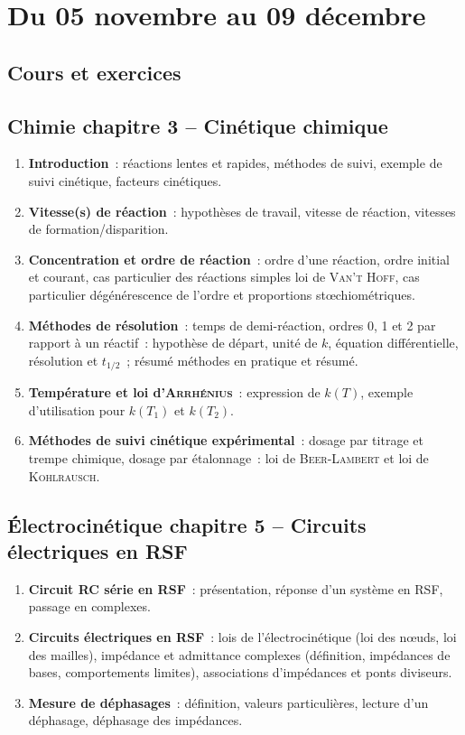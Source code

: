 \documentclass[a4paper, 12pt, final, garamond]{book}
\begin{document}
\setcounter{chapter}{9}

\chapter{Du 05 novembre au 09 d\'ecembre}

\section{Cours et exercices}
\section*{Chimie chapitre 3 -- Cinétique chimique}
\begin{enumerate}[label=\Roman*]
    \item \textbf{Introduction}~: réactions lentes et rapides, méthodes de
        suivi, exemple de suivi cinétique, facteurs cinétiques.
    \item \textbf{Vitesse(s) de réaction}~: hypothèses de travail, vitesse de
        réaction, vitesses de formation/disparition.
    \item \textbf{Concentration et ordre de réaction}~: ordre d'une réaction,
        ordre initial et courant, cas particulier des réactions simples loi de
        \textsc{Van't Hoff}, cas particulier dégénérescence de l'ordre et
        proportions stœchiométriques.
    \item \textbf{Méthodes de résolution}~: temps de demi-réaction, ordres 0, 1
        et 2 par rapport à un réactif~: hypothèse de départ, unité de $k$,
        équation différentielle, résolution et $t_{1/2}$~; résumé méthodes en
        pratique et résumé.
    \item \textbf{Température et loi d'\textsc{Arrhénius}}~: expression de
        $k(T)$, exemple d'utilisation pour $k(T_1)$ et $k(T_2)$.
    \item \textbf{Méthodes de suivi cinétique expérimental}~: dosage par
        titrage et trempe chimique, dosage par étalonnage~: loi de
        \textsc{Beer-Lambert} et loi de \textsc{Kohlrausch}.
\end{enumerate}

\section*{Électrocinétique chapitre 5 -- Circuits électriques en RSF}
\begin{enumerate}[label=\Roman*]
    \item \textbf{Circuit RC série en RSF}~: présentation, réponse d'un système
        en RSF, passage en complexes.
    \item \textbf{Circuits électriques en RSF}~: lois de l'électrocinétique (loi
        des nœuds, loi des mailles), impédance et admittance complexes
        (définition, impédances de bases, comportements limites), associations
        d'impédances et ponts diviseurs.
    \item \textbf{Mesure de déphasages}~: définition, valeurs particulières,
        lecture d'un déphasage, déphasage des impédances.
\end{enumerate}
\end{document}

